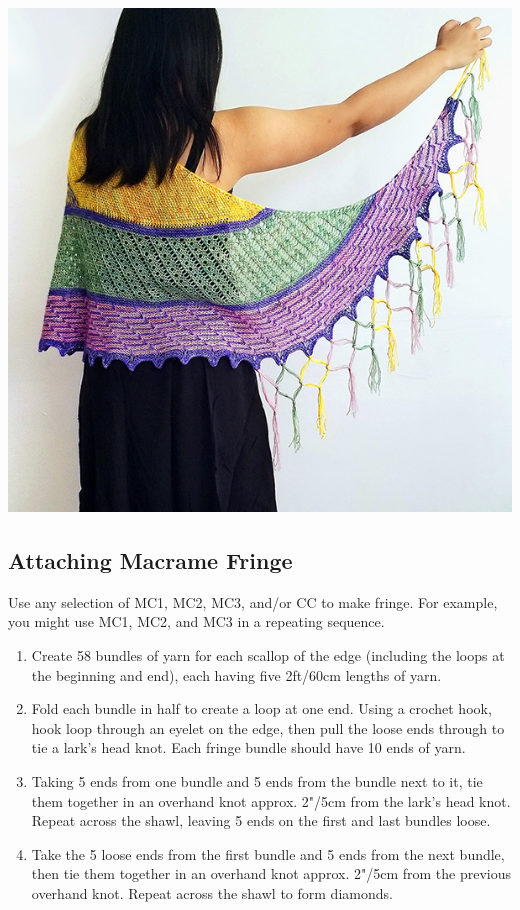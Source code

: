 \documentclass[12pt]{article}
\begin{document}
\begin{multicols}{2}
\vfill
\begin{center}
\includegraphics[width=.9\linewidth]{macrame.jpg}
\end{center}

\subsection*{Attaching Macrame Fringe}

Use any selection of MC1, MC2, MC3, and/or CC to make fringe. For example, you might use MC1, MC2, and MC3 in a repeating sequence.

\begin{enumerate}
\item Create 58 bundles of yarn for each scallop of the edge (including the loops at the beginning and end), each having five 2ft/60cm lengths of yarn.
\item Fold each bundle in half to create a loop at one end. Using a crochet hook, hook loop through an eyelet on the edge, then pull the loose ends through to tie a lark's head knot. Each fringe bundle should have 10 ends of yarn.
\item Taking 5 ends from one bundle and 5 ends from the bundle next to it, tie them together in an overhand knot approx. 2"/5cm from the lark's head knot. Repeat across the shawl, leaving 5 ends on the first and last bundles loose.
\item Take the 5 loose ends from the first bundle and 5 ends from the next bundle, then tie them together in an overhand knot approx. 2"/5cm from the previous overhand knot. Repeat across the shawl to form diamonds.
\end{enumerate}
\vfill
~
\end{multicols}
\end{document}
